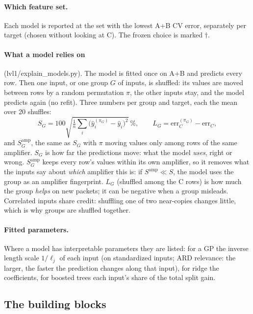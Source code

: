 \paragraph{Which feature set.} Each model is reported at the set with the lowest A+B CV error, separately per target
(chosen without looking at C). The frozen choice is marked $\dagger$.

\paragraph{What a model relies on} (lvl1/explain\_models.py). The model is fitted once on A+B and predicts every row.
Then one input, or one group $G$ of inputs, is shuffled: its values are moved between rows by a random permutation
$\pi$, the other inputs stay, and the model predicts again (no refit). Three numbers per group and target, each the
mean over 20 shuffles:
\[
S_G=100\sqrt{\tfrac1n\textstyle\sum_i\big(\hat y_i^{(\pi_G)}-\hat y_i\big)^2}\ \%,\qquad
L_G=\text{err}_C^{(\pi_G)}-\text{err}_C ,
\]
and $S_G^{\text{amp}}$, the same as $S_G$ with $\pi$ moving values only among rows of the same amplifier.
$S_G$ is how far the predictions move: what the model \emph{uses}, right or wrong. $S^{\text{amp}}_G$ keeps every
row's values within its own amplifier, so it removes what the inputs say about \emph{which} amplifier this is: if
$S^{\text{amp}}\ll S$, the model uses the group as an amplifier fingerprint. $L_G$ (shuffled among the C rows) is how
much the group \emph{helps} on new packets; it can be negative when a group misleads. Correlated inputs share credit:
shuffling one of two near-copies changes little, which is why groups are shuffled together.

\paragraph{Fitted parameters.} Where a model has interpretable parameters they are listed: for a GP the inverse length
scale $1/\ell_j$ of each input (on standardized inputs; ARD relevance: the larger, the faster the prediction changes
along that input), for ridge the coefficients, for boosted trees each input's share of the total split gain.

\subsection{The building blocks}
\label{app:blocks}

